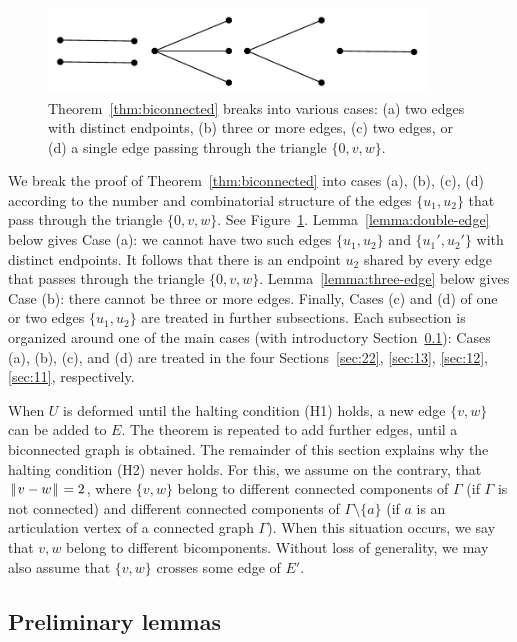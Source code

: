 \documentclass[11pt]{amsart}
\def\|{{\hskip0.1em|\hskip-0.15em|\hskip0.1em}}
\begin{document}
\begin{figure}
\begin{center}
\includegraphics[width=10cm]{cases.pdf}
\end{center}
\caption{Theorem~\ref{thm:biconnected} breaks into various cases: (a) two edges with
distinct endpoints, (b) three or more edges, (c) two edges, or (d) a single edge
passing through the triangle $\{0,v,w\}$.}
\label{fig:cases}
\end{figure}

We break the proof of Theorem~\ref{thm:biconnected} into cases (a), (b), (c), (d) according
to the number and combinatorial structure of the edges $\{u_1,u_2\}$
that pass through the triangle $\{0,v,w\}$.  See Figure~\ref{fig:cases}.
Lemma~\ref{lemma:double-edge} below gives Case (a): we cannot have two such edges $\{u_1,u_2\}$ and $\{u_1',u_2'\}$ with distinct endpoints.   It follows that there is an endpoint $u_2$ shared by every edge that passes through the
triangle $\{0,v,w\}$.  Lemma~\ref{lemma:three-edge} below gives Case (b): there cannot be three or more edges.  Finally, Cases (c) and (d) of one or two edges $\{u_1,u_2\}$ are treated in further subsections.  Each subsection is organized
around one of the main cases (with introductory Section~\ref{sec:pre}): Cases (a), (b), (c), and (d) are
treated in the four Sections~\ref{sec:22}, \ref{sec:13}, \ref{sec:12}, \ref{sec:11}, respectively.


When $U$ is deformed until the halting condition (H1) holds, a new edge $\{v,w\}$ can be added to $E$.
The theorem is repeated to add further edges, until a biconnected graph is obtained.  
The remainder of this section explains why the halting condition (H2) never holds.  For
this, we assume on the contrary, that $\|v-w\|=2$, where $\{v,w\}$ belong to different connected components
of $\Gamma$ (if $\Gamma$ is not connected) and different connected components of $\Gamma\setminus\{a\}$ (if $a$
is an articulation vertex of a connected graph $\Gamma$).  When this situation occurs, we say that $v,w$ belong to
different bicomponents.  Without loss of generality, we may also assume that $\{v,w\}$ crosses some edge of $E'$.

\subsection{Preliminary lemmas}\label{sec:pre}
\end{document}
